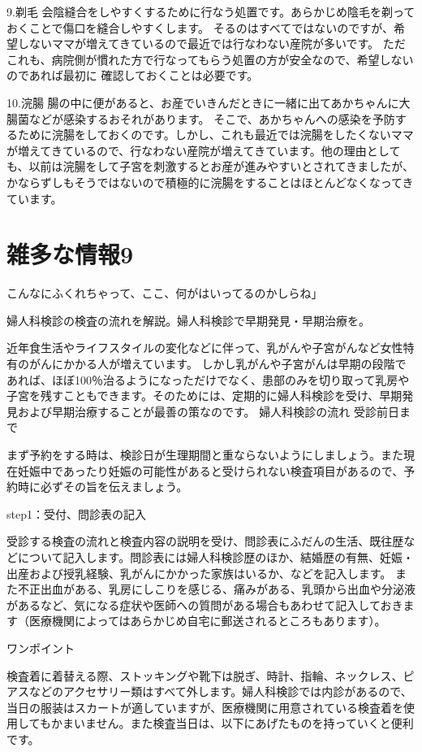 9.剃毛
会陰縫合をしやすくするために行なう処置です。あらかじめ陰毛を剃っておくことで傷口を縫合しやすくします。
そるのはすべてではないのですが、希望しないママが増えてきているので最近では行なわない産院が多いです。
ただこれも、病院側が慣れた方で行なってもらう処置の方が安全なので、希望しないのであれば最初に
確認しておくことは必要です。

10.浣腸
腸の中に便があると、お産でいきんだときに一緒に出てあかちゃんに大腸菌などが感染するおそれがあります。
そこで、あかちゃんへの感染を予防するために浣腸をしておくのです。しかし、これも最近では浣腸をしたくないママが増えてきているので、行なわない産院が増えてきています。他の理由としても、以前は浣腸をして子宮を刺激するとお産が進みやすいとされてきましたが、かならずしもそうではないので積極的に浣腸をすることはほとんどなくなってきています。



\section{雑多な情報9}

こんなにふくれちゃって、ここ、何がはいってるのかしらね」


婦人科検診の検査の流れを解説。婦人科検診で早期発見・早期治療を。


近年食生活やライフスタイルの変化などに伴って、乳がんや子宮がんなど女性特有のがんにかかる人が増えています。
しかし乳がんや子宮がんは早期の段階であれば、ほぼ100％治るようになっただけでなく、患部のみを切り取って乳房や子宮を残すこともできます。そのためには、定期的に婦人科検診を受け、早期発見および早期治療することが最善の策なのです。
婦人科検診の流れ
受診前日まで

まず予約をする時は、検診日が生理期間と重ならないようにしましょう。また現在妊娠中であったり妊娠の可能性があると受けられない検査項目があるので、予約時に必ずその旨を伝えましょう。

step1：受付、問診表の記入

受診する検査の流れと検査内容の説明を受け、問診表にふだんの生活、既往歴などについて記入します。問診表には婦人科検診歴のほか、結婚歴の有無、妊娠・出産および授乳経験、乳がんにかかった家族はいるか、などを記入します。
また不正出血がある、乳房にしこりを感じる、痛みがある、乳頭から出血や分泌液があるなど、気になる症状や医師への質問がある場合もあわせて記入しておきます（医療機関によってはあらかじめ自宅に郵送されるところもあります）。

ワンポイント

検査着に着替える際、ストッキングや靴下は脱ぎ、時計、指輪、ネックレス、ピアスなどのアクセサリー類はすべて外します。婦人科検診では内診があるので、当日の服装はスカートが適していますが、医療機関に用意されている検査着を使用してもかまいません。また検査当日は、以下にあげたものを持っていくと便利です。

